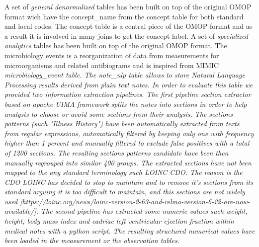 A set of \emph{general denormalized} tables has been built on top of the
original OMOP format wich have the concept\_name from the concept table for
both standard and local codes. The concept table is a central piece of the OMOP
format and as a result it is involved in many joins to get the concept label. 
A set of \emph{specialized analytics} tables has been built on top of the
original OMOP format. The microbiology events is a reorganization of data from
measurements for microorganisms and related antibiograms and is inspired from
MIMIC \it{microbiology\_event} table. 
The \it{note\_nlp} table allows to store Natural Language Processing results
derived from plain text notes. In order to evaluate this table we provided
two information extraction pipelines.
The \emph{first} pipeline \emph{section extractor} based on apache UIMA framework
splits the notes into sections in order to help analysts to choose or avoid
some sections from their analysis.  The sections patterns (such "Illness
History") have been automatically extracted from texts from regular
expressions, automatically filtered by keeping only one with frequency higher
than 1 percent and manually filtered to exclude false positives with a total of
1200 sections. The resulting sections patterns candidate have been then
manually regrouped into similar 400 groups. The extracted sections have not
been mapped to the any standard terminology such LOINC CDO. The reason is the
CDO LOINC has decided to stop to maintain and to remove it's sections from its
standard arguing it is too difficult to maintain, and this sections are not
widely used
[https://loinc.org/news/loinc-version-2-63-and-relma-version-6-22-are-now-available/].
The \emph{second} pipeline has extracted some numeric values such weight,
height, body mass index and cadriac left ventricular ejection fraction within
medical notes with a python script. The resulting structured numerical values
have been loaded in the measurement or the observation tables.
